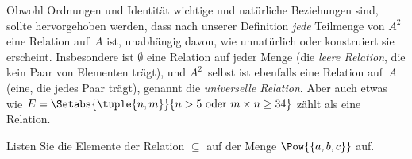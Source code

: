 \documentclass[../../../include/open-logic-section]{subfiles}
\begin{document}
\begin{explain}
Obwohl Ordnungen und Identität wichtige und natürliche Beziehungen sind,
sollte hervorgehoben werden, dass nach unserer Definition \emph{jede}
Teilmenge von $A^{2}$ eine Relation auf~$A$ ist, unabhängig davon, wie unnatürlich oder
konstruiert sie erscheint. Insbesondere ist $\emptyset$ eine Relation auf jeder
Menge (die \emph{leere Relation}, die kein Paar von Elementen trägt), und
$A^{2}$~selbst ist ebenfalls eine Relation auf~$A$ (eine, die jedes Paar
trägt), genannt die \emph{universelle Relation}. Aber auch etwas wie
$E=\Setabs{\tuple{n, m}}{n>5 \text{ oder } m \times n \ge 34}$ zählt als
eine Relation.
\end{explain}
  
\begin{prob}
  Listen Sie die Elemente der Relation $\subseteq$ auf der Menge
  $\Pow{\{a, b, c\}}$ auf.
\end{prob}
\end{document}
